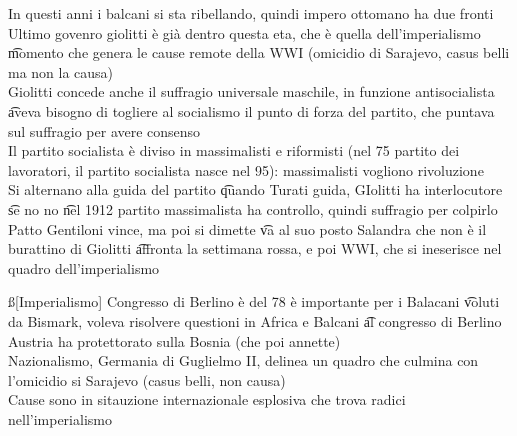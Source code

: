 \documentclass[12pt]{article}
\begin{document}
In questi anni i balcani si sta ribellando, quindi impero ottomano ha due fronti \\
Ultimo govenro giolitti è già dentro questa eta, che è quella dell'imperialismo \t momento che genera le cause remote della WWI (omicidio di Sarajevo, casus belli ma non la causa) \\
Giolitti concede anche il suffragio universale maschile, in funzione antisocialista \t aveva bisogno di togliere al socialismo il punto di forza del partito, che puntava sul suffragio per avere consenso \\
Il partito socialista è diviso in massimalisti e riformisti (nel 75 partito dei lavoratori, il partito socialista nasce nel 95): massimalisti vogliono rivoluzione \\
Si alternano alla guida del partito \t quando Turati guida, GIolitti ha interlocutore \t se no no \t nel 1912 partito massimalista ha controllo, quindi suffragio per colpirlo \\
Patto Gentiloni vince, ma poi si dimette \t va al suo posto Salandra che non è il burattino di Giolitti \t affronta la settimana rossa, e poi WWI, che si ineserisce nel quadro dell'imperialismo

\ss[Imperialismo]
Congresso di Berlino è del 78 è importante per i Balacani \t voluti da Bismark, voleva risolvere questioni in Africa e Balcani \t al congresso di Berlino Austria ha protettorato sulla Bosnia (che poi annette) \\
Nazionalismo, Germania di Guglielmo II, delinea un quadro che culmina con l'omicidio si Sarajevo (casus belli, non causa) \\
Cause sono in sitauzione internazionale esplosiva che trova radici nell'imperialismo
\end{document}
